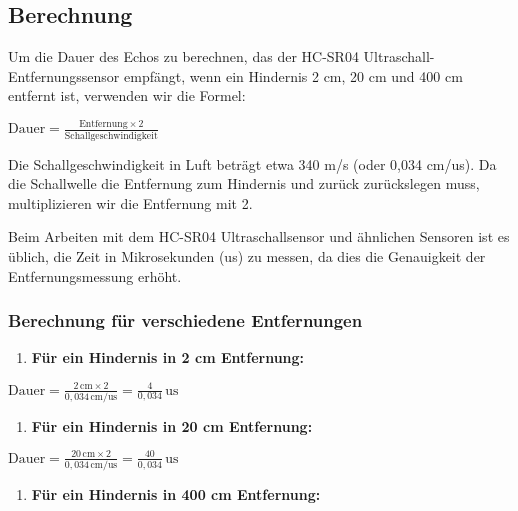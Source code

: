 \documentclass{vorlage-design-main}
\begin{document}
\hypertarget{berechnung}{%
\subsection{Berechnung}\label{berechnung}}

Um die Dauer des Echos zu berechnen, das der HC-SR04
Ultraschall-Entfernungssensor empfängt, wenn ein Hindernis 2 cm, 20 cm
und 400 cm entfernt ist, verwenden wir die Formel:

$\text{Dauer} = \frac{\text{Entfernung} \times 2}{\text{Schallgeschwindigkeit}}$

Die Schallgeschwindigkeit in Luft beträgt etwa 340 m/s (oder 0,034
cm/us). Da die Schallwelle die Entfernung zum Hindernis und zurück
zurückslegen muss, multiplizieren wir die Entfernung mit 2.

Beim Arbeiten mit dem HC-SR04 Ultraschallsensor und ähnlichen Sensoren
ist es üblich, die Zeit in Mikrosekunden (us) zu messen, da dies die
Genauigkeit der Entfernungsmessung erhöht.

\hypertarget{berechnung-fuxfcr-verschiedene-entfernungen}{%
\subsubsection{Berechnung für verschiedene
Entfernungen}\label{berechnung-fuer-verschiedene-entfernungen}}

\begin{enumerate}
\def\labelenumi{\arabic{enumi}.}

\item
  \textbf{Für ein Hindernis in 2 cm Entfernung:}
\end{enumerate}

$\text{Dauer} = \frac{2 \, \text{cm} \times 2}{0,034 \, \text{cm/us}} = \frac{4}{0,034} \, \text{us}$

\begin{enumerate}
\def\labelenumi{\arabic{enumi}.}
\setcounter{enumi}{1}

\item
  \textbf{Für ein Hindernis in 20 cm Entfernung:}
\end{enumerate}

$\text{Dauer} = \frac{20 \, \text{cm} \times 2}{0,034 \, \text{cm/us}} = \frac{40}{0,034} \, \text{us}$

\begin{enumerate}
\def\labelenumi{\arabic{enumi}.}
\setcounter{enumi}{2}

\item
  \textbf{Für ein Hindernis in 400 cm Entfernung:}
\end{enumerate}
\end{document}
